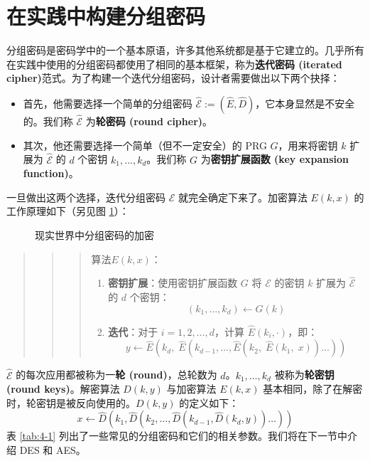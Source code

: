 \section{在实践中构建分组密码}\label{sec:4-2}

分组密码是密码学中的一个基本原语，许多其他系统都是基于它建立的。几乎所有在实践中使用的分组密码都使用了相同的基本框架，称为\textbf{迭代密码 (iterated cipher)}范式。为了构建一个迭代分组密码，设计者需要做出以下两个抉择：
\begin{itemize}
	\item 首先，他需要选择一个简单的分组密码 $\mathcal{\hat E}:=(\hat E,\hat D)$，它本身显然是不安全的。我们称 $\mathcal{\hat E}$ 为\textbf{轮密码 (round cipher)}。
	\item 其次，他还需要选择一个简单（但不一定安全）的 PRG $G$，用来将密钥 $k$ 扩展为 $\mathcal{\hat E}$ 的 $d$ 个密钥 $k_1,\dots,k_d$。我们称 $G$ 为\textbf{密钥扩展函数 (key expansion function)}。
\end{itemize}
一旦做出这两个选择，迭代分组密码 $\mathcal{E}$ 就完全确定下来了。加密算法 $E(k,x)$ 的工作原理如下（另见图 \ref{fig:4-6}）：

\begin{figure}
  \centering
  
  \caption{现实世界中分组密码的加密}
  \label{fig:4-6}
\end{figure}

\begin{quote}
\begin{quote}
\begin{quote}
\begin{tcolorbox}[colframe=black,colback=white,boxrule=0.6pt,arc=0pt]
算法$E(k,x)$：

\vspace{5pt}

\begin{enumerate}
	\item \textbf{密钥扩展}：使用密钥扩展函数 $G$ 将 $\mathcal{E}$ 的密钥 $k$ 扩展为 $\mathcal{\hat E}$ 的 $d$ 个密钥：
	\[(k_1,\dots,k_d)\leftarrow G(k)\]
    \item \textbf{迭代}：对于 $i=1,2,\dots,d$，计算 $\hat E(k_i,\cdot)$，即：
    \[y\leftarrow\hat{E}(k_d,\;\hat{E}(k_{d-1},\dots,\hat{E}(k_2,\;\hat{E}(k_1,\;x))\dots))\]
\end{enumerate}
\end{tcolorbox}
\end{quote}
\end{quote}
\end{quote}
$\mathcal{\hat E}$ 的每次应用都被称为一\textbf{轮 (round)}，总轮数为 $d$。$k_1,\dots,k_d$ 被称为\textbf{轮密钥 (round keys)}。解密算法 $D(k, y)$ 与加密算法 $E(k,x)$ 基本相同，除了在解密时，轮密钥是被反向使用的。$D(k,y)$ 的定义如下：
\[
x\leftarrow\hat{D}(k_1,\hat{D}(k_2,\dots,\hat{D}(k_{d-1},\hat{D}(k_d,y))\dots))
\]
表 \ref{tab:4-1} 列出了一些常见的分组密码和它们的相关参数。我们将在下一节中介绍 DES 和 AES。

